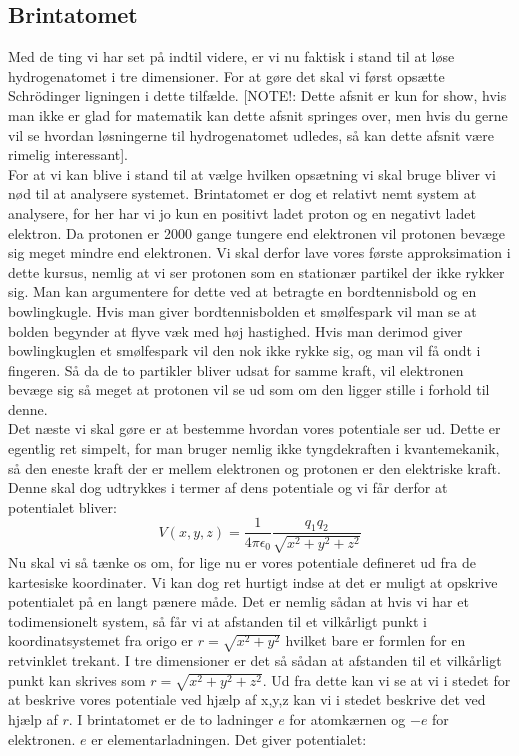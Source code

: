 \documentclass[../../Atom-ogMolekylefysik.tex]{subfiles}
\begin{document}
\subsection*{Brintatomet}
Med de ting vi har set på indtil videre, er vi nu faktisk i stand til at løse hydrogenatomet i tre dimensioner. For at gøre det skal vi først opsætte Schrödinger ligningen i dette tilfælde. [NOTE!: Dette afsnit er kun for show, hvis man ikke er glad for matematik kan dette afsnit springes over, men hvis du gerne vil se hvordan løsningerne til hydrogenatomet udledes, så kan dette afsnit være rimelig interessant].\\
For at vi kan blive i stand til at vælge hvilken opsætning vi skal bruge bliver vi nød til at analysere systemet. Brintatomet er dog et relativt nemt system at analysere, for her har vi jo kun en positivt ladet proton og en negativt ladet elektron. Da protonen er 2000 gange tungere end elektronen vil protonen bevæge sig meget mindre end elektronen. Vi skal derfor lave vores første approksimation i dette kursus, nemlig at vi ser protonen som en stationær partikel der ikke rykker sig. Man kan argumentere for dette ved at betragte en bordtennisbold og en bowlingkugle. Hvis man giver bordtennisbolden et smølfespark vil man se at bolden begynder at flyve væk med høj hastighed. Hvis man derimod giver bowlingkuglen et smølfespark vil den nok ikke rykke sig, og man vil få ondt i fingeren. Så da de to partikler bliver udsat for samme kraft, vil elektronen bevæge sig så meget at protonen vil se ud som om den ligger stille i forhold til denne.\\
Det næste vi skal gøre er at bestemme hvordan vores potentiale ser ud. Dette er egentlig ret simpelt, for man bruger nemlig ikke tyngdekraften i kvantemekanik, så den eneste kraft der er mellem elektronen og protonen er den elektriske kraft. Denne skal dog udtrykkes i termer af dens potentiale og vi får derfor at potentialet bliver:
\begin{equation*}
    V(x,y,z)=\frac{1}{4\pi\epsilon_{0}}\frac{q_{1}q_{2}}{\sqrt{x^2+y^2+z^2}}
\end{equation*}
Nu skal vi så tænke os om, for lige nu er vores potentiale defineret ud fra de kartesiske koordinater. Vi kan dog ret hurtigt indse at det er muligt at opskrive potentialet på en langt pænere måde. Det er nemlig sådan at hvis vi har et todimensionelt system, så får vi at afstanden til et vilkårligt punkt i koordinatsystemet fra origo er $r=\sqrt{x^2+y^2}$ hvilket bare er formlen for en retvinklet trekant. I tre dimensioner er det så sådan at afstanden til et vilkårligt punkt kan skrives som $r=\sqrt{x^2+y^2+z^2}$. Ud fra dette kan vi se at vi i stedet for at beskrive vores potentiale ved hjælp af x,y,z kan vi i stedet beskrive det ved hjælp af $r$. I brintatomet er de to ladninger $e$ for atomkærnen og $-e$ for elektronen. $e$ er elementarladningen. Det giver potentialet:
\end{document}
